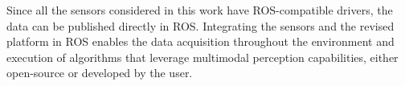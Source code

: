 \documentclass[letterpaper,10pt,conference]{IEEEtran} %
\begin{document}
Since all the sensors considered in this work have ROS-compatible drivers,
the data can be published directly in ROS.
Integrating the sensors and the revised platform in ROS enables the
data acquisition throughout the environment and execution of
algorithms that leverage multimodal perception capabilities,
either open-source or developed by the user.






\end{document}
